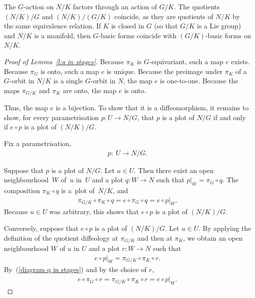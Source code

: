 \documentclass[11pt]{article}
\numberwithin{equation}{section}
\begin{document}
\begin{Remark} \label{r:splits}
The $G$-action on $N/K$ factors through an action of $G/K$.
The quotients $(N/K)/G$ and $(N/K)/(G/K)$ coincide,
as they are quotients of $N/K$ by the same equivalence relation.
If $K$ is closed in $G$ (so that $G/K$ is a Lie group)
and $N/K$ is a manifold, then $G$-basic forms coincide with $(G/K)$-basic forms
on $N/K$.
\end{Remark}


\begin{proof}[Proof of Lemma~\ref{l:q in stages}]
Because $\pi_K$ is $G$-equivariant, such a map $e$ exists.
Because $\pi_G$ is onto, such a map $e$ is unique.
Because the preimage under $\pi_K$ of a $G$-orbit in $N/K$
is a single $G$-orbit in $N$, the map $e$ is one-to-one.
Because the maps $\pi_{G/K}$ and $\pi_K$ are onto,
the map $e$ is onto.

Thus, the map $e$ is a bijection. To show that it is a dif\/feomorphism,
it remains to show,
for every parametrisation $p \colon U \to N/G$,
that $p$ is a plot of $N/G$ if and only if $e \circ p$ is a plot of $(N/K)/G$.

Fix a parametrisation,
\begin{gather*} p \colon \ U \to N/G.\end{gather*}

Suppose that $p$ is a plot of $N/G$. Let $u \in U$.
Then there exist an open neighbourhood~$W$ of~$u$ in~$U$
and a plot $q \colon W \to N$ such that $p|_W = \pi_G \circ q$.
The composition $\pi_K \circ q$ is a~plot of~$N/K$, and
\begin{gather*} \pi_{G/K} \circ \pi_K \circ q = e \circ \pi_G \circ q = e \circ p|_W.\end{gather*}
Because $u \in U$ was arbitrary,
this shows that $e \circ p$ is a plot of $(N/K)/G$.

Conversely, suppose that $e \circ p$ is a plot of $(N/K)/G$.
Let $u \in U$. By applying the def\/inition of the quotient dif\/feology
at $\pi_{G/K}$ and then at $\pi_K$,
we obtain an open neighbourhood $W$ of $u$ in $U$
and a plot $r \colon W \to N$ such that
\begin{gather*} e \circ p|_W = \pi_{G/K} \circ \pi_K \circ r .\end{gather*}
By~(\ref{diagram q in stages}) and by the choice of $r$,
\begin{gather*}e \circ \pi_G \circ r = \pi_{G/K} \circ \pi_K \circ r = e \circ p|_W.\end{gather*}


\end{proof}
\end{document}
